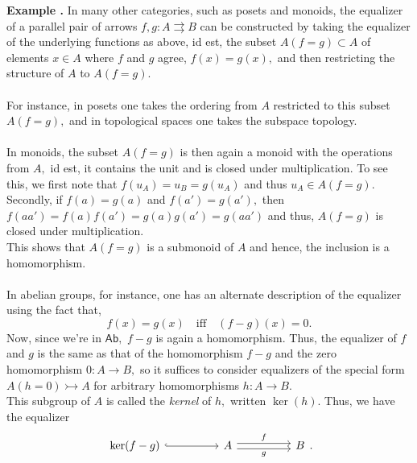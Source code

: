 \documentclass[11pt,leqno,landscape,semhelv]{seminar}
\theoremstyle{definition}
\numberwithin{joke}{section}
\numberwithin{thm}{section}
\numberwithin{equation}{section}
\newcommand{\example}[1]{\refstepcounter{thm}\par\medskip
   {\textbf{Example \thethm.} #1} \rmfamily}
\newcommand{\mono}{\rightarrowtail}
\newcommand{\tto}{\rightrightarrows}
\begin{document}
\example{} In many other categories, such as posets and monoids, the equalizer of a parallel pair of arrows $f, g:A\tto B$ can be constructed by taking the equalizer of the underlying functions as above, id est, the subset $A(f = g) \subset A$ of elements $x \in A$ where $f$ and $g$ agree, $f(x) = g(x),$ and then restricting the structure of $A$ to $A(f = g).$ \\~\\
%
%
For instance, in posets one takes the ordering from $A$ restricted to this subset $A(f = g),$ and in topological spaces one takes the subspace topology.\\~\\
%
In monoids, the subset $A(f = g)$ is then again a monoid with the operations from $A,$ id est, it contains the unit and is closed under multiplication. To see this, we first note that $f(u_A) = u_B = g(u_A)$ and thus $u_A \in A(f = g).$ Secondly, if $f(a) = g(a)$ and $f(a') = g(a'),$ then $f(aa') = f(a)f(a') = g(a)g(a') = g(aa')$ and thus, $A(f = g)$ is closed under multiplication.\\
This shows that $A(f = g)$ is a submonoid of $A$ and hence, the inclusion is a homomorphism.\\~\\
%
In abelian groups, for instance, one has an alternate description of the equalizer using the fact that,
\begin{equation*} 
  f(x) = g(x) \quad \text{iff} \quad (f - g)(x) = 0.
\end{equation*}
Now, since we're in $\mathsf{Ab},$ $f - g$ is again a homomorphism. Thus, the equalizer of $f$ and $g$ is the same as that of the homomorphism $f - g$ and the zero homomorphism $0:A\to B,$ so it suffices to consider equalizers of the special form $A(h = 0) \mono A$ for arbitrary homomorphisms $h:A\to B.$ \\
This subgroup of $A$ is called the \emph{kernel} of $h,$ written $\ker(h).$ Thus, we have the equalizer
\begin{equation*} 
  \begin{tikzcd}
    \ker(f - g) \arrow[rr, hook] && A \arrow[rr, "f", shift left] \arrow[rr, "g"', shift right] && B
  \end{tikzcd}.
\end{equation*}
\end{document}
